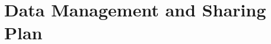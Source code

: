\documentclass[11pt,oneside,final]{article}
\begin{document}
    \section*{Data Management and Sharing Plan}
\end{document}

